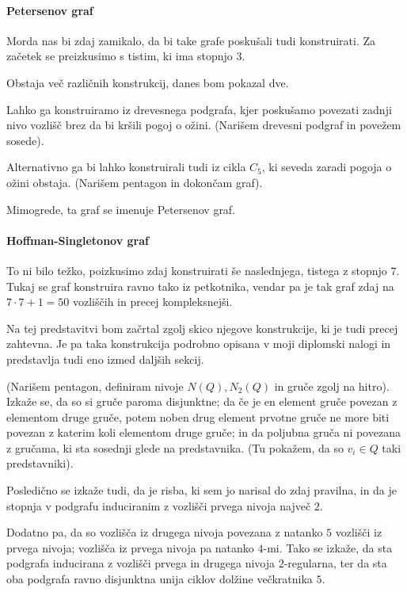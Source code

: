 \documentclass{fmfkpb}
\begin{document}
\paragraph{Petersenov graf}
Morda nas bi zdaj zamikalo, da bi take grafe poskušali tudi konstruirati.
Za začetek se preizkusimo s tistim, ki ima stopnjo $3$.

Obstaja več različnih konstrukcij, danes bom pokazal dve.

Lahko ga konstruiramo iz drevesnega podgrafa, kjer poskušamo povezati zadnji
nivo vozlišč brez da bi kršili pogoj o ožini. 
(Narišem drevesni podgraf in povežem sosede).

Alternativno ga bi lahko konstruirali tudi iz cikla $C_5$, 
ki seveda zaradi pogoja o ožini obstaja. 
(Narišem pentagon in dokončam graf).

Mimogrede, ta graf se imenuje Petersenov graf.

\paragraph{Hoffman-Singletonov graf}
To ni bilo težko, poizkusimo zdaj konstruirati še naslednjega, tistega z stopnjo $7$.
Tukaj se graf konstruira ravno tako iz petkotnika, vendar pa je tak graf 
zdaj na $7\cdot 7 + 1 = 50$ vozliščih in precej kompleksnejši.

Na tej predstavitvi bom začrtal zgolj skico njegove konstrukcije, 
ki je tudi precej zahtevna. Je pa taka konstrukcija podrobno opisana v
moji diplomski nalogi in predstavlja tudi eno izmed daljših sekcij.

(Narišem pentagon, definiram nivoje $N(Q), N_2(Q)$ in gruče zgolj na hitro).
Izkaže se, da so si gruče paroma disjunktne; da če je en element
gruče povezan z elementom druge gruče, potem noben drug element prvotne 
gruče ne more biti povezan z katerim koli elementom druge gruče;
in da poljubna gruča ni povezana z gručama, ki sta sosednji glede na 
predstavnika. (Tu pokažem, da so $v_i \in Q$ taki predstavniki).

Posledično se izkaže tudi, da je risba, ki sem jo narisal do zdaj pravilna,
in da je stopnja v podgrafu induciranim z vozlišči prvega nivoja največ $2$.


Dodatno pa, da so vozlišča iz drugega nivoja povezana z natanko $5$ 
vozlišči iz prvega nivoja; vozlišča iz prvega nivoja pa natanko $4$-mi.
Tako se izkaže, da sta podgrafa inducirana z vozlišči prvega in 
drugega nivoja $2$-regularna, ter da sta oba podgrafa ravno
disjunktna unija ciklov dolžine večkratnika $5$.
\end{document}
